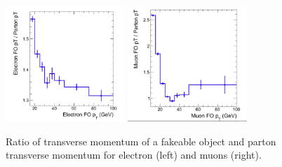 \documentclass{cmspaper}
\begin{document}
\begin{figure}[!htbp]                                                                                         
\begin{center}                                                                                                
\includegraphics[width=0.4\textwidth]{figures/ElectronPtResponse.png}                                            
\includegraphics[width=0.4\textwidth]{figures/MuonPtResponse.png}\\                                           
\caption{Ratio of transverse momentum of a fakeable object and parton transverse momentum
for electron (left) and muons (right). }                                                                                 
\label{fig:ptresponse}                                                                                          
\end{center}                                                                                                  
\end{figure}   
\end{document}
